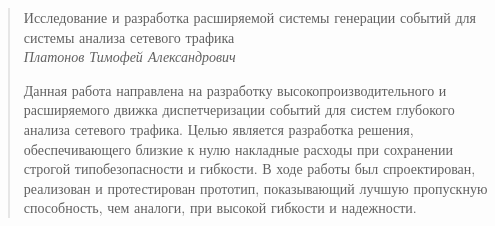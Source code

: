 \begin{abstract}

    \begin{center}
    \large{Исследование и разработка расширяемой системы генерации событий для системы анализа сетевого трафика} \\[0.5 cm]
    \large{\textit{Платонов Тимофей Александрович}} \\[1 cm]
    \end{center}

Данная работа направлена на разработку высокопроизводительного и расширяемого движка диспетчеризации событий для систем глубокого анализа сетевого трафика.
Целью является разработка решения, обеспечивающего близкие к нулю накладные расходы при сохранении строгой типобезопасности и гибкости.
В ходе работы был спроектирован, реализован и протестирован прототип, показывающий лучшую пропускную способность, чем аналоги, при высокой гибкости и надежности.

\end{abstract}
\newpage
